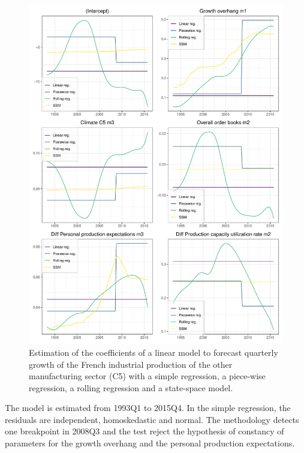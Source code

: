 \documentclass[12pt,a4paper]{article}
\begin{document}
\begin{figure}[H]
\includegraphics[width=1\linewidth]{img/example} \caption{Estimation of the coefficients of a linear model to forecast quarterly growth of the French industrial production of the other manufacturing sector (C5) with a simple regression, a piece-wise regression, a rolling regression and a state-space model.}\label{fig:example}
\end{figure}

The model is estimated from 1993Q1 to 2015Q4.
In the simple regression, the residuals are independent, homoskedastic and normal.
The \citet{bai2003computation} methodology detects one breakpoint in 2008Q3 and the \citet{hansen1992testing} test reject the hypothesis of constancy of parameters for the growth overhang and the personal production expectations.
\end{document}

